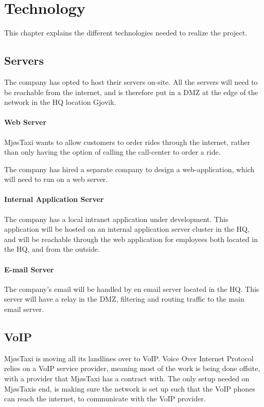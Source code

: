 \chapter{Technology} %
\label{chap:technology}


This chapter explains the different technologies needed to realize the project.

\section{Servers}
The company has opted to host their servers on-site.
All the servers will need to be reachable from the internet, and is therefore put in a DMZ at the edge of the network in the HQ location Gjovik.

\subsubsection{Web Server}
MjøsTaxi wants to allow customers to order rides through the internet, rather than only having the option of calling the call-center to order a ride.

The company has hired a separate company to design a web-application, which will need to run on a web server.

\subsubsection{Internal Application Server}
The company has a local intranet application under development. This application will be hosted on an internal application server cluster in the HQ, and will be reachable through the web application for employees both located in the HQ, and from the outside. %

\subsubsection{E-mail Server}
The company's email will be handled by en email server located in the HQ.
This server will have a relay in the DMZ, filtering and routing traffic to the main email server.


\section{VoIP}
MjøsTaxi is moving all its landlines over to VoIP.
Voice Over Internet Protocol relies on a VoIP service provider, meaning most of the work is being done offsite, with a provider that MjøsTaxi has a contract with. \cite{VoIP} 
The only setup needed on MjøsTaxis end, is making sure the network is set up such that the VoIP phones can reach the internet, to communicate with the VoIP provider.

